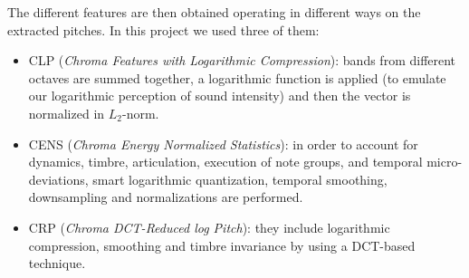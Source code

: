 %
The different features are then obtained operating in different ways on the extracted pitches. In this project we used three of them:
\begin{itemize}[noitemsep,nolistsep]
	\item CLP (\textit{Chroma Features with Logarithmic Compression}): bands from different octaves are summed together, a logarithmic function is applied (to emulate our logarithmic perception of sound intensity) and then the vector is normalized in $L_2$-norm.
	\item CENS (\textit{Chroma Energy Normalized Statistics}): in order to account for dynamics, timbre, articulation, execution of note groups, and temporal micro-deviations, smart logarithmic quantization, temporal smoothing, downsampling and normalizations are performed.
	\item CRP (\textit{Chroma DCT-Reduced log Pitch}): they include logarithmic compression, smoothing and timbre invariance by using a DCT-based technique.
\end{itemize}